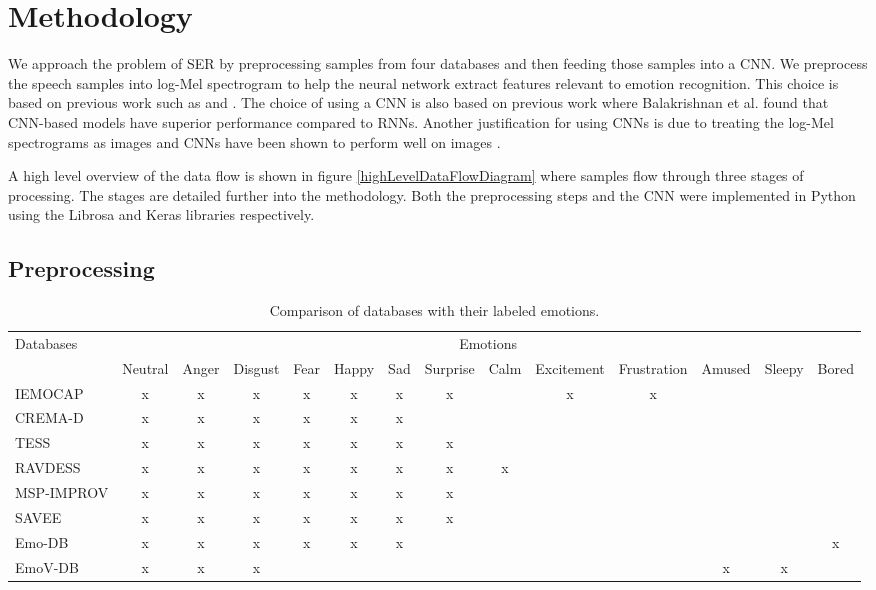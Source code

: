 \section{Methodology}

We approach the problem of SER by preprocessing samples from four databases and then feeding those samples into a CNN. We preprocess the speech samples into log-Mel spectrogram to help the neural network extract features relevant to emotion recognition. This choice is based on previous work such as \cite{Engel2019} and \cite{Badshah2017}. The choice of using a CNN is also based on previous work where Balakrishnan et al. \cite{Balakrishnan2017} found that CNN-based models have superior performance compared to RNNs. Another justification for using CNNs is due to treating the log-Mel spectrograms as images and CNNs have been shown to perform well on images \cite{Krizhevsky2012}.

A high level overview of the data flow is shown in figure \ref{highLevelDataFlowDiagram} where samples flow through three stages of processing. The stages are detailed further into the methodology. Both the preprocessing steps and the CNN were implemented in Python using the Librosa \cite{McFee2015} and Keras \cite{Chollet2015} libraries respectively.

\subsection{Preprocessing} \label{Preprocessing}

\begin{table*}
	\centering
	\caption{Comparison of databases with their labeled emotions.}
	\label{dbEmoTable}
	\begin{tabular}{@{}lccccccccccccc@{}}
		\toprule
		Databases & \multicolumn{13}{c}{Emotions} \\ 
		\cmidrule{2-14}
		& Neutral & Anger & Disgust & Fear & Happy & Sad & Surprise & Calm & Excitement & Frustration & Amused & Sleepy & Bored \\ 
		\midrule
		IEMOCAP & x & x & x & x & x & x & x &   & x & x &   &   &   \\
		CREMA-D & x & x & x & x & x & x &   &   &   &   &   &   &   \\
		TESS & x & x & x & x & x & x & x &   &   &   &   &   &   \\
		RAVDESS & x & x & x & x & x & x & x & x &   &   &   &   &   \\
		MSP-IMPROV & x & x & x & x & x & x & x &   &   &   &   &   &   \\
		SAVEE & x & x & x & x & x & x & x &   &   &   &   &   &   \\
		Emo-DB & x & x & x & x & x & x &   &   &   &   &   &   & x \\
		EmoV-DB & x & x & x &   &   &   &   &   &   &   & x & x &   \\
		\bottomrule
	\end{tabular}%
\end{table*}

